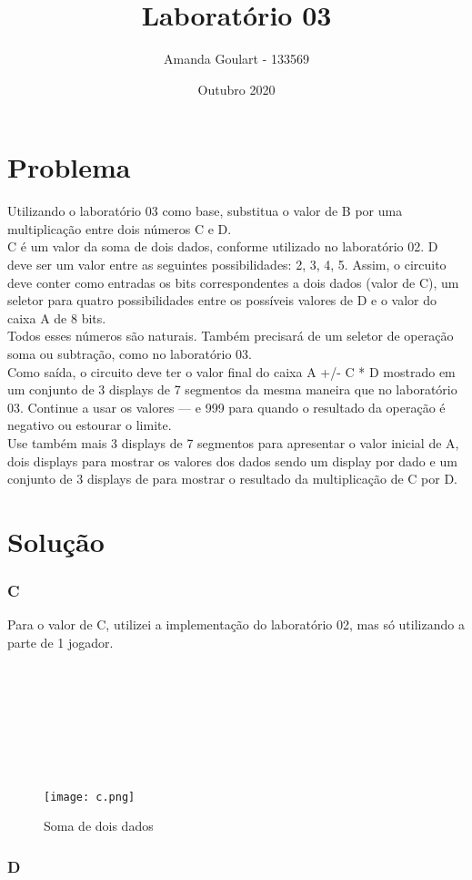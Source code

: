 \documentclass{article}
\title{Laboratório 03}
\author{Amanda Goulart - 133569}
\date{Outubro 2020}
\begin{document}
\section{Problema}
Utilizando o laboratório 03 como base, substitua o valor de B por uma multiplicação entre dois
números C e D.
\\
C é um valor da soma de dois dados, conforme utilizado no laboratório 02.
D deve ser um valor entre as seguintes possibilidades: 2, 3, 4, 5.
Assim, o circuito deve conter como entradas os bits correspondentes a dois dados (valor de C), um
seletor para quatro possibilidades entre os possíveis valores de D e o valor do caixa A de 8 bits.
\\
Todos
esses números são naturais. Também precisará de um seletor de operação soma ou subtração, como no
laboratório 03.
\\
Como saída, o circuito deve ter o valor final do caixa A +/- C * D mostrado em um conjunto de 3
displays de 7 segmentos da mesma maneira que no laboratório 03. Continue a usar os valores --- e 999
para quando o resultado da operação é negativo ou estourar o limite.
\\
Use também mais 3 displays de 7
segmentos para apresentar o valor inicial de A, dois displays para mostrar os valores dos dados sendo
um display por dado e um conjunto de 3 displays de para mostrar o resultado da multiplicação de C por
D.
\section{Solução}

\subsubsection{C}

Para o valor de C, utilizei a implementação do laboratório 02, mas só utilizando a parte de 1 jogador.
\\
\\
\\
\\
\\
\\
\\
\\
\begin{figure}[!h]
\centering
\texttt{[image: c.png]}
\caption{Soma de dois dados}
\label{fig:CL_logo}
\end{figure}

\subsubsection{D}
\end{document}
